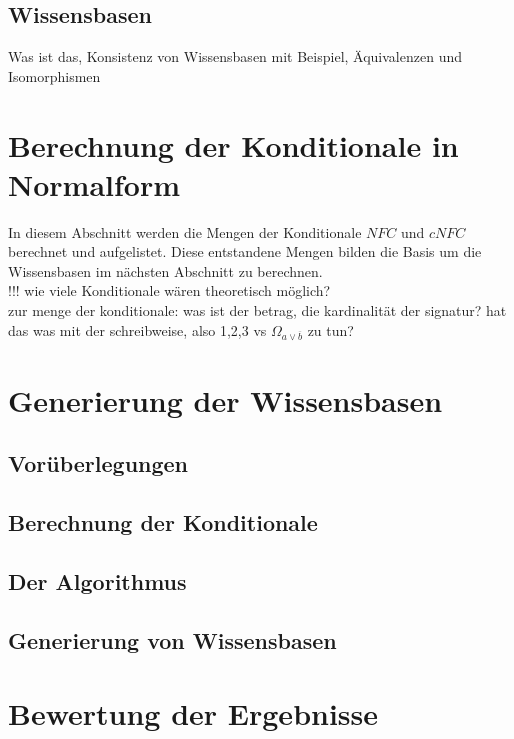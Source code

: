 \documentclass[12pt,a4paper]{article}
\begin{document}
\subsection{Wissensbasen}
Was ist das, Konsistenz von Wissensbasen mit Beispiel, Äquivalenzen und Isomorphismen

\section{Berechnung der Konditionale in Normalform}
In diesem Abschnitt werden die Mengen der Konditionale $NFC$ und $cNFC$ berechnet und aufgelistet. Diese entstandene Mengen bilden die Basis um die Wissensbasen im nächsten Abschnitt zu berechnen. \\
!!! wie viele Konditionale wären theoretisch möglich?  \\
zur menge der konditionale: was ist der betrag, die kardinalität der signatur? hat das was mit der schreibweise, also {1,2,3} vs $\Omega_{a \vee \overline{b}}$ zu tun?
\section{Generierung der Wissensbasen}
\subsection{Vorüberlegungen}
\subsection{Berechnung der Konditionale}
\subsection{Der Algorithmus}
\subsection{Generierung von Wissensbasen}
\section{Bewertung der Ergebnisse}

\newpage

 
\end{document}
